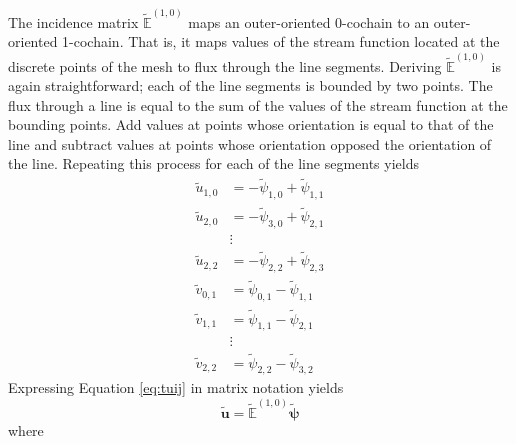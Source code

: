 The incidence matrix $\tilde{\mathbb{E}}^{(1,0)}$ maps an outer-oriented 0-cochain to an outer-oriented 1-cochain. That is, it maps values of the stream function located at the discrete points of the mesh to flux through the line segments. Deriving $\tilde{\mathbb{E}}^{(1,0)}$ is again straightforward; each of the line segments is bounded by two points. The flux through a line is equal to the sum of the values of the stream function at the bounding points. Add values at points whose orientation is equal to that of the line and subtract values at points whose orientation opposed the orientation of the line. Repeating this process for each of the line segments yields
\begin{equation}
    \begin{split}
        \tilde{u}_{1,0} &= -\tilde{\psi}_{1,0} + \tilde{\psi}_{1,1} \\
        \tilde{u}_{2,0} &= -\tilde{\psi}_{3,0} + \tilde{\psi}_{2,1} \\
        &\vdots \\
        \tilde{u}_{2,2} &= -\tilde{\psi}_{2,2} + \tilde{\psi}_{2,3} \\
        \tilde{v}_{0,1} &= \tilde{\psi}_{0,1} - \tilde{\psi}_{1,1} \\
        \tilde{v}_{1,1} &= \tilde{\psi}_{1,1} - \tilde{\psi}_{2,1} \\
        &\vdots \\
        \tilde{v}_{2,2} &= \tilde{\psi}_{2,2} - \tilde{\psi}_{3,2}
    \end{split}
    \label{eq:tuij}
\end{equation}
Expressing Equation \eqref{eq:tuij} in matrix notation yields
\begin{equation}
    \mathbf{\tilde{u}} = \mathbb{\tilde{E}}^{(1,0)} \mathbf{\tilde{\psi}}
\end{equation}
where
